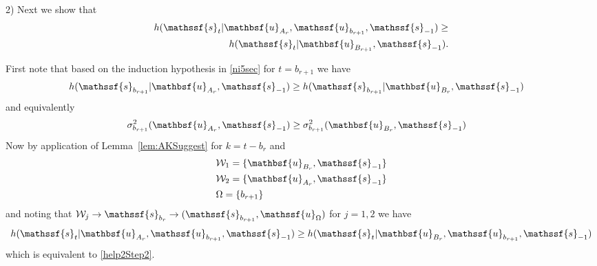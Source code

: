 \documentclass[journal, twocolumn, 10pt]{IEEEtran}
\newcommand{\cW}{{\mathcal{W}}}
\newcommand{\rvs}{{\mathssf{s}}}    %
\newcommand{\rvu}{{\mathssf{u}}}    %
\newcommand{\rvbu}{{\mathbsf{u}}}
\begin{document}
{%

2) Next we show that 
\begin{align}
h(\rvs_{t}| \rvbu_{A_{r}}, \rvu_{b_{r+1}}, \rvs_{-1}) \ge \\ h(\rvs_{t}| \rvbu_{B_{r+1}}, \rvs_{-1}) \label{help2Step2}.
\end{align}

First note that based on the induction hypothesis in \eqref{ni5sec} for $t=b_{r+1}$ we have 
\begin{align}
&h(\rvs_{b_{r+1}}|\rvbu_{A_r}, \rvs_{-1}) \ge h(\rvs_{b_{r+1}}|\rvbu_{B_r}, \rvs_{-1}) 
\end{align} and equivalently 
\begin{align}
&\sigma^{2}_{b_{r+1}}(\rvbu_{A_r}, \rvs_{-1}) \ge \sigma^2_{b_{r+1}}(\rvbu_{B_r}, \rvs_{-1}) 
\end{align} Now by application of Lemma~\ref{lem:AKSuggest} for $k= t-b_{r}$ and 
\begin{align}
&\cW_{1}=  \{\rvbu_{B_r}, \rvs_{-1}\}\label{eq:sari11}\\
&\cW_{2}=  \{\rvbu_{A_r}, \rvs_{-1} \}\label{eq:sari22}\\
& \Omega = \{b_{r+1}\}
\end{align} and noting that $\cW_j \rightarrow \rvs_{b_r} \rightarrow (\rvs_{b_{r+1}}, \rvu_\Omega)$ for $j=1,2$
we have
\begin{align}
h(\rvs_{t} | \rvbu_{A_r},\rvu_{b_{r+1}},  \rvs_{-1}) \ge h(\rvs_{t} |\rvbu_{B_r}, \rvu_{b_{r+1}}, \rvs_{-1})
\end{align} which is equivalent to \eqref{help2Step2}.

}
\end{document}
